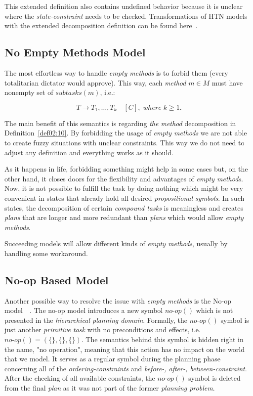 This extended definition also contains undefined behavior because it is unclear where the \emph{state-constraint} needs to be checked. Transformations of HTN models with the extended decomposition definition can be found here~\cite{ondrckova2024empty}.

\subsection{No Empty Methods Model}\label{sub03:311}

\medskip\noindent
The most effortless way to handle \emph{empty methods} is to forbid them (every totalitarian dictator would approve). This way, each \emph{method} $m \in M$ must have nonempty set of $subtasks(m)$, i.e.:

\[
    T \rightarrow T_1,\dots,T_k \quad [C], \; where \; k \geq 1.
\]

\noindent
The main benefit of this semantics is regarding \emph{the method} decomposition in Definition~\ref{def02:10}. By forbidding the usage of \emph{empty methods} we are not able to create fuzzy situations with unclear constraints. This way we do not need to adjust any definition and everything works as it should.

\medskip\noindent
As it happens in life, forbidding something might help in some cases but, on the other hand, it closes doors for the flexibility and advantages of \emph{empty methods}. Now, it is not possible to fulfill the task by doing nothing which might be very convenient in states that already hold all desired \emph{propositional symbols}. In such states, the decomposition of certain \emph{compound tasks} is meaningless and creates \emph{plans} that are longer and more redundant than \emph{plans} which would allow \emph{empty methods}.

\medskip\noindent
Succeeding models will allow different kinds of \emph{empty methods}, usually by handling some workaround.

\subsection{No-op Based Model}

\medskip\noindent
Another possible way to resolve the issue with \emph{empty methods} is the No-op model~\cite{ondrckova2023semantics}~\cite{ondrckova2024empty}. The no-op model introduces a new symbol $no\text{-}op()$ which is not presented in the \emph{hierarchical planning domain}. Formally, the $no\text{-}op()$ symbol is just another \emph{primitive task} with no preconditions and effects, i.e. $no\text{-}op() = (\{\}, \{\}, \{\})$. The semantics behind this symbol is hidden right in the name, "no operation", meaning that this action has no impact on the world that we model. It serves as a regular symbol during the planning phase concerning all of the \emph{ordering-constraints} and \emph{before-, after-, between-constraint}. After the checking of all available constraints, the $no\text{-}op()$ symbol is deleted from the final \emph{plan} as it was not part of the former \emph{planning problem}.

